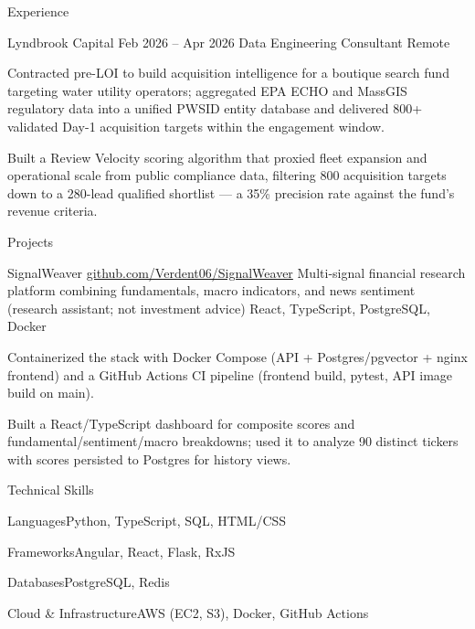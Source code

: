 \documentclass[
	11pt
]{../../../template}
\begin{document}
\begin{rSection}{E}{xperience}
		\begin{rSectionEntry}
			{Lyndbrook Capital}
			{Feb 2026 -- Apr 2026}
			{Data Engineering Consultant}
			{}
			{Remote}

			\item Contracted pre-LOI to build acquisition intelligence for a boutique search fund targeting water utility operators; aggregated EPA ECHO and MassGIS regulatory data into a unified PWSID entity database and delivered 800+ validated Day-1 acquisition targets within the engagement window.
			\item Built a Review Velocity scoring algorithm that proxied fleet expansion and operational scale from public compliance data, filtering 800 acquisition targets down to a 280-lead qualified shortlist --- a 35\% precision rate against the fund's revenue criteria.
		\end{rSectionEntry}
	\end{rSection}

	\begin{rSection}{P}{rojects}
		\begin{rSectionEntry}
			{SignalWeaver}
			{\href{https://github.com/Verdent06/SignalWeaver}{github.com/Verdent06/SignalWeaver}}
			{Multi-signal financial research platform combining fundamentals, macro indicators, and news sentiment (research assistant; not investment advice)}
			{React, TypeScript, PostgreSQL, Docker}
			{}

			\item Containerized the stack with Docker Compose (API + Postgres/pgvector + nginx frontend) and a GitHub Actions CI pipeline (frontend build, pytest, API image build on main).
			\item Built a React/TypeScript dashboard for composite scores and fundamental/sentiment/macro breakdowns; used it to analyze 90 distinct tickers with scores persisted to Postgres for history views.
		\end{rSectionEntry}
	\end{rSection}

	\begin{rSection}{T}{echnical Skills}
		\begin{rSet}{Languages}{Python, TypeScript, SQL, HTML/CSS}
		\end{rSet}
		\begin{rSet}{Frameworks}{Angular, React, Flask, RxJS}
		\end{rSet}
		\begin{rSet}{Databases}{PostgreSQL, Redis}
		\end{rSet}
		\begin{rSet}{Cloud \& Infrastructure}{AWS (EC2, S3), Docker, GitHub Actions}
		\end{rSet}
	\end{rSection}
\end{document}
